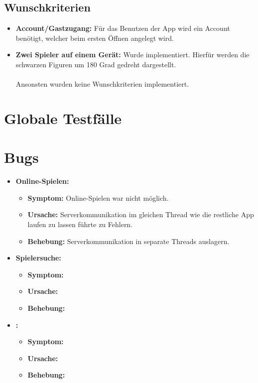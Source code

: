 \documentclass[parskip=full]{scrartcl}
\begin{document}
\subsection{Wunschkriterien}
\begin{itemize}
\item{\textbf{Account/Gastzugang:}} Für das Benutzen der App wird ein Account benötigt, welcher beim ersten Öffnen angelegt wird.
\item{\textbf{Zwei Spieler auf einem Gerät:}} Wurde implementiert. Hierfür werden die schwarzen Figuren um 180 Grad gedreht dargestellt. \\
\\
Ansonsten wurden keine Wunschkriterien implementiert.
\end{itemize}
\section{Globale Testfälle}
\section{Bugs}
\begin{itemize}
\item{\textbf{Online-Spielen:}}
	\begin{itemize}
	\item{\textbf{Symptom:}} Online-Spielen war nicht möglich.
	\item{\textbf{Ursache:}} Serverkommunikation im gleichen Thread wie die restliche App laufen zu 	lassen führte zu Fehlern.
	\item{\textbf{Behebung:}} Serverkommunikation in separate Threads auslagern.
	\end{itemize}
\item{\textbf{Spielersuche:}}
	\begin{itemize}
	\item{\textbf{Symptom:}}
	\item{\textbf{Ursache:}}
	\item{\textbf{Behebung:}}
	\end{itemize}
\item{\textbf{:}}
	\begin{itemize}
	\item{\textbf{Symptom:}}
	\item{\textbf{Ursache:}}
	\item{\textbf{Behebung:}}
	\end{itemize}
\end{itemize}
\end{document}
